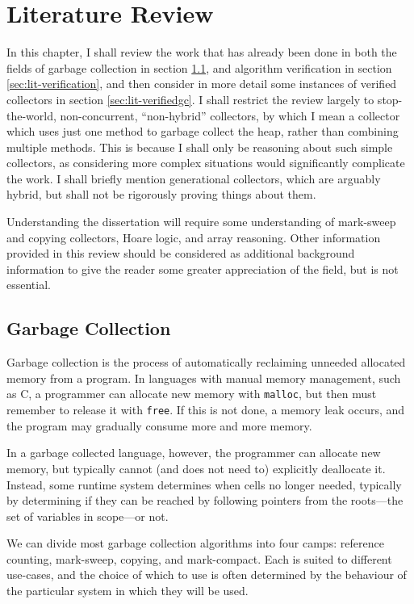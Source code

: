 \chapter{Literature Review}
\label{sec:lit}

In this chapter, I shall review the work that has already been done in
both the fields of garbage collection in section \ref{sec:lit-gc}, and
algorithm verification in section \ref{sec:lit-verification}, and then
consider in more detail some instances of verified collectors in
section \ref{sec:lit-verifiedgc}. I shall restrict the review largely
to stop-the-world, non-concurrent, ``non-hybrid'' collectors, by which
I mean a collector which uses just one method to garbage collect the
heap, rather than combining multiple methods. This is because I shall
only be reasoning about such simple collectors, as considering more
complex situations would significantly complicate the work. I shall
briefly mention generational collectors, which are arguably hybrid,
but shall not be rigorously proving things about them.

Understanding the dissertation will require some understanding of
mark-sweep and copying collectors, Hoare logic, and array
reasoning. Other information provided in this review should be
considered as additional background information to give the reader
some greater appreciation of the field, but is not essential.

\section{Garbage Collection}
\label{sec:lit-gc}

Garbage collection is the process of automatically reclaiming unneeded
allocated memory from a program. In languages with manual
memory management, such as C, a programmer can allocate new memory
with \texttt{malloc}, but then must remember to release it with
\texttt{free}.\cite{KandR} If this is not done, a memory leak occurs,
and the program may gradually consume more and more memory.

In a garbage collected language, however, the programmer can allocate
new memory, but typically cannot (and does not need to) explicitly
deallocate it. Instead, some runtime system determines when cells no
longer needed, typically by determining if they can be reached by
following pointers from the roots---the set of variables in scope---or
not.

We can divide most garbage collection algorithms into four camps:
reference counting, mark-sweep, copying, and
mark-compact. Each is suited to different use-cases, and the
choice of which to use is often determined by the behaviour of the
particular system in which they will be used.

